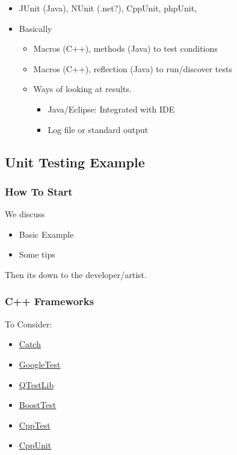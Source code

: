 \begin{itemize}
\itemsep1pt\parskip0pt
\item
  JUnit (Java), NUnit (.net?), CppUnit, phpUnit,
\item
  Basically

  \begin{itemize}
  \itemsep1pt\parskip0pt
  \item
    Macros (C++), methods (Java) to test conditions
  \item
    Macros (C++), reflection (Java) to run/discover tests
  \item
    Ways of looking at results.

    \begin{itemize}
    \itemsep1pt\parskip0pt
    \item
      Java/Eclipse: Integrated with IDE
    \item
      Log file or standard output
    \end{itemize}
  \end{itemize}
\end{itemize}

\subsection{Unit Testing Example}\label{unit-testing-example}

\subsubsection{How To Start}\label{how-to-start}

We discuss

\begin{itemize}
\itemsep1pt\parskip0pt
\item
  Basic Example
\item
  Some tips
\end{itemize}

Then its down to the developer/artist.

\subsubsection{C++ Frameworks}\label{c-frameworks}

To Consider:

\begin{itemize}
\itemsep1pt\parskip0pt
\item
  \href{https://github.com/philsquared/Catch}{Catch}
\item
  \href{https://code.google.com/p/googletest/}{GoogleTest}
\item
  \href{http://qt-project.org/doc/qt-4.8/qtestlib-manual.html}{QTestLib}
\item
  \href{http://www.boost.org/doc/libs/1_57_0/libs/test/doc/html/index.html}{BoostTest}
\item
  \href{http://cpptest.sourceforge.net/}{CppTest}
\item
  \href{http://sourceforge.net/projects/cppunit/}{CppUnit}
\end{itemize}

